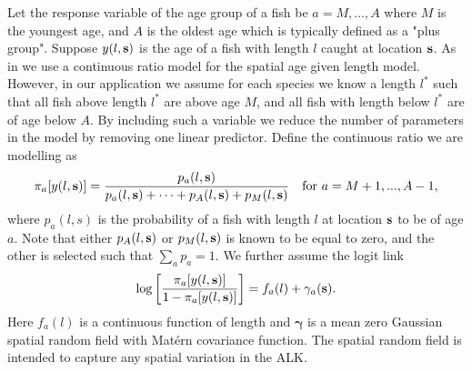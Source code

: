 \documentclass[a4paper 12pt]{article}
\numberwithin{equation}{section}
\begin{document}
Let the response variable of the age group of a fish be $a = M,...,A$ where $M$ is the youngest age, and $A$ is the oldest age which is typically defined as a "plus group". Suppose $y(l,{\bf s})$ is the age  of a fish with length $l$ caught at location ${\bf s}$. As in \citet{berg2012spatial} we use a continuous ratio model for the spatial age given length model. However, in our application we assume for each species we know a length $l^*$ such that all fish above length $l^*$ are above age $M$, and all fish with length below $l^*$ are of age below $A$. By including such a variable we reduce the number of parameters in the model by removing one linear predictor. Define the continuous ratio we are modelling as
\begin{equation}\label{eq:linearPred1}
\pi_a[y(l,{\bf s})] = \frac{p_a(l,{\bf s})}{p_a(l,{\bf s}) + \cdots + p_{A}(l,{\bf s}) +p_{M}(l,{\bf s}) } \vspace{ 4mm} \ \ \ \text{for } a =M+1,...,A-1 ,
\end{equation}
where \vspace{-5mm} $p_a(l,s)$ is the probability of a fish with length $l$ at location ${\bf s}$ to be of age $a$. Note that either $p_{A}(l,{\bf s})$ or $p_{M}(l,{\bf s})$ is known to be equal to zero, and the other is selected such that $\sum_a p_a = 1$. We further assume the logit link
\begin{equation}\label{eq:linearPred}
\log \left[ \frac{\pi_a[y(l,{\bf s})]}{1-\pi_a[y(l,{\bf s})]}\right] = f_a(l) + \gamma_a({\bf s}).
\end{equation}
Here $ f_a(l)$ is a continuous function of length and $\pmb{\gamma}$ is a mean zero Gaussian spatial random field with Mat\'{e}rn covariance function. The spatial random field is intended to capture any spatial variation in the ALK.
\end{document}
